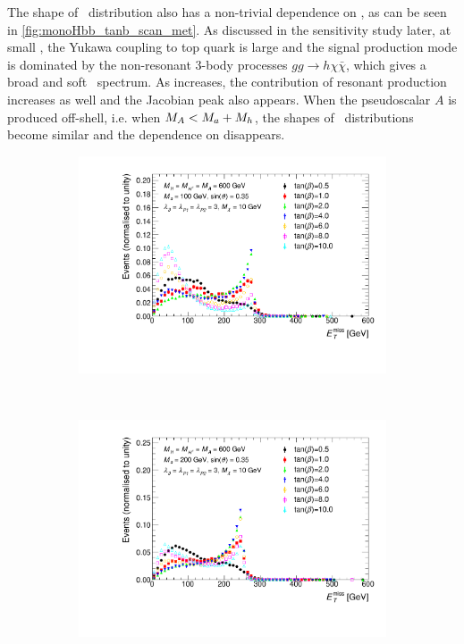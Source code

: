 The shape of \MET\ distribution also has a non-trivial dependence on \tanb, as can be seen in \autoref{fig:monoHbb_tanb_scan_met}.
As discussed in the sensitivity study later, at small \tanb, the Yukawa coupling 
to top quark is large and the signal production mode is dominated by the 
non-resonant 3-body processes $gg\rightarrow h\chi\bar{\chi}$, which gives a broad 
and soft \MET\ spectrum. As \tanb increases, the contribution of 
resonant production increases as well and the Jacobian peak also appears.
When the pseudoscalar $A$ is produced off-shell, i.e. when $M_{A}<M_{a}+M_{h}$, the shapes 
of \MET\ distributions become similar and the dependence on \tanb disappears.


\begin{figure}[tbp]
\centering
\begin{subfigure}{0.48\textwidth}
\includegraphics[width = \textwidth]{texinputs/04_grid/figures/monoHbb_tanb_scan_MA600_Ma100_MET_liny_norm2one.pdf}
\end{subfigure}
~
\begin{subfigure}{0.48\textwidth}
\includegraphics[width = \textwidth]{texinputs/04_grid/figures/monoHbb_tanb_scan_MA600_Ma200_MET_liny_norm2one.pdf}

\end{subfigure}
\end{figure}
